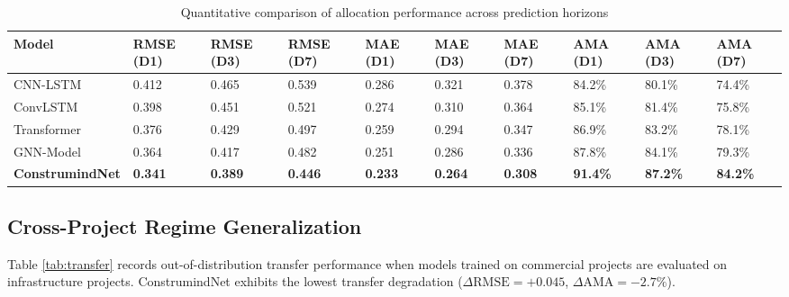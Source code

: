 \documentclass[11pt,a4paper]{article}
\begin{document}
\begin{table}[t]
\centering
\small
\caption{Quantitative comparison of allocation performance across prediction horizons}\label{tab:quant}
\begin{tabular*}{\textwidth}{@{\extracolsep\fill}llllllllll@{\extracolsep\fill}}
\toprule
\textbf{Model} & \textbf{RMSE (D1)} & \textbf{RMSE (D3)} & \textbf{RMSE (D7)} & \textbf{MAE (D1)} & \textbf{MAE (D3)} & \textbf{MAE (D7)} & \textbf{AMA (D1)} & \textbf{AMA (D3)} & \textbf{AMA (D7)} \\
\midrule
CNN-LSTM \cite{inam2024} & 0.412 & 0.465 & 0.539 & 0.286 & 0.321 & 0.378 & 84.2\% & 80.1\% & 74.4\% \\
ConvLSTM \cite{shin2023} & 0.398 & 0.451 & 0.521 & 0.274 & 0.310 & 0.364 & 85.1\% & 81.4\% & 75.8\% \\
Transformer \cite{inam2025a} & 0.376 & 0.429 & 0.497 & 0.259 & 0.294 & 0.347 & 86.9\% & 83.2\% & 78.1\% \\
GNN-Model \cite{liu2025} & 0.364 & 0.417 & 0.482 & 0.251 & 0.286 & 0.336 & 87.8\% & 84.1\% & 79.3\% \\
\midrule
\textbf{ConstrumindNet} & \textbf{0.341} & \textbf{0.389} & \textbf{0.446} & \textbf{0.233} & \textbf{0.264} & \textbf{0.308} & \textbf{91.4\%} & \textbf{87.2\%} & \textbf{84.2\%} \\
\bottomrule
\end{tabular*}
\end{table}

\subsection{Cross-Project Regime Generalization}
Table \ref{tab:transfer} records out-of-distribution transfer performance when models trained on commercial projects are evaluated on infrastructure projects. ConstrumindNet exhibits the lowest transfer degradation ($\Delta\text{RMSE} = +0.045$, $\Delta\text{AMA} = -2.7\%$).
\end{document}
